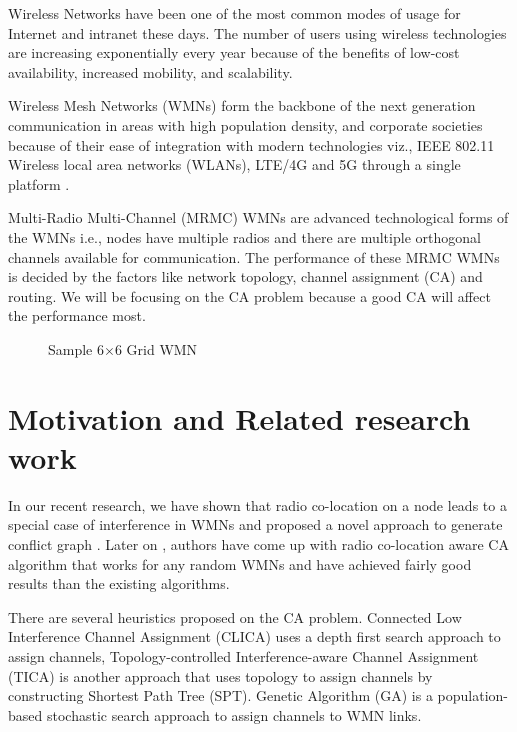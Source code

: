 \documentclass[conference]{IEEEtran}
\begin{document}
Wireless Networks have been one of the most common modes of usage for Internet and intranet these days. 
The number of users using wireless technologies are increasing exponentially every year because of the benefits of low-cost availability, increased mobility, and scalability.

Wireless Mesh Networks (WMNs) form the backbone of the next generation communication in areas with high population density, and corporate societies
because of their ease of integration with modern technologies viz., IEEE 802.11 Wireless local area networks (WLANs), LTE/4G and 5G through a single platform \cite{12Capone}. 

Multi-Radio Multi-Channel (MRMC) WMNs are advanced technological forms of the WMNs i.e., nodes have multiple radios  and there are multiple orthogonal channels available  for communication.
The performance of these MRMC WMNs is decided by the factors like network topology, channel assignment (CA) and routing.
We will be focusing on the CA problem because a good CA will affect the performance most.

\begin{figure}
  \centering {\texttt{[image: 6x6ne]}}
    \caption{Sample 6$\times$6 Grid WMN }
     \label{sample}
\end{figure} 

\section{Motivation and Related research work}
In our recent research, we have shown that radio co-location on a node leads to a special case of interference in WMNs 
and proposed  a novel approach to generate conflict graph \cite{kala2016interference}. 
Later on \cite{kala2015radio},  authors have come up with radio co-location aware CA algorithm  that works for any random WMNs 
and have achieved fairly good results than the existing algorithms. 

There are several heuristics proposed on the CA problem.  
Connected Low Interference Channel Assignment (CLICA) \cite{marina2010topology} uses a depth first search approach
to assign channels,
Topology-controlled Interference-aware Channel Assignment (TICA) \cite{chaudhry2012improving} is another approach that 
uses topology to assign channels by constructing Shortest Path Tree (SPT).
Genetic Algorithm (GA) \cite{sridhar2009channel} is a population-based stochastic search approach to assign channels to WMN links.
\end{document}
